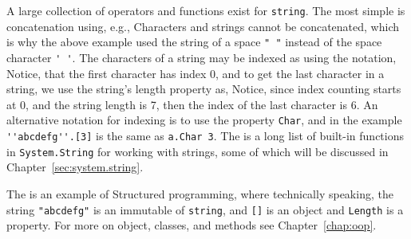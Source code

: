 A large collection of operators and functions exist for \lstinline{string}. The most simple is concatenation using, e.g.,
%
%
%
Characters and strings cannot be concatenated, which is why the above example used the string of  a space \lstinline|" "| instead of the space character \lstinline|' '|. The characters of a string may be indexed as using the  notation,
%
%
%
Notice, that the first character has index 0, and to get the last character in a string, we use the string's length property as,
%
%
%
Notice, since index counting starts at 0, and the string length is 7, then the index of the last character is 6. An alternative notation for indexing is to use the property \lstinline|Char|, and in the example \lstinline|''abcdefg''.[3]| is the same as \lstinline|a.Char 3|. The is a long list of built-in functions in \lstinline|System.String| for working with strings, some of which will be discussed in Chapter~\ref{sec:system.string}.
 
The  is an example of Structured programming, where technically speaking, the string \lstinline|"abcdefg"| is an immutable  of  \lstinline|string|, and \lstinline|[]| is an object  and \lstinline|Length| is a property. For more on object, classes, and methods see Chapter~\ref{chap:oop}.  

